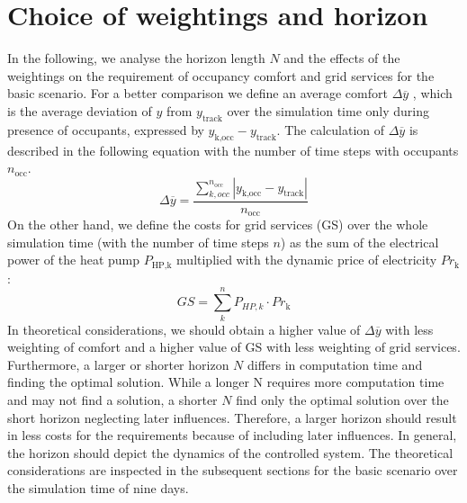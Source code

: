 \section{Choice of weightings and horizon}
\label{Choise of weigtings and horizon}
In the following, we analyse the horizon length $N$  and the effects of the weightings on the requirement of occupancy comfort and grid services for the basic scenario. For a better comparison we define an average comfort $\Delta \overline{y}$ , which is the average deviation of $y$ from $y_\text{track}$ over the simulation time only during presence of occupants, expressed by $y_\text{k,occ} - y_\text{track}$. The calculation of $\Delta \overline{y}$ is described in the following equation with the number of time steps with occupants $n_\text{occ}$.
\begin{equation}
    \label{eq:average comfort}
    \Delta \overline{y} = \frac{\sum_{k,occ}^{n_\text{occ}} |y_\text{k,occ} - y_\text{track}|}{n_\text{occ}}
\end{equation}
On the other hand, we define the costs for grid services (GS)  over the whole simulation time (with the number of time steps $n$) as the sum of the electrical power of the heat pump $P_\text{HP,k}$ multiplied with the dynamic price of electricity $Pr_\text{k}$:
\begin{equation}
\label{eq:GridService123}
    GS = \sum_{k}^n P_{HP,k}\cdot Pr_\text{k}
\end{equation}
In theoretical considerations, we should obtain a higher value of $\Delta \overline{y}$ with less weighting of comfort and a higher value of GS with less weighting of grid services. Furthermore, a larger or shorter horizon $N$ differs in computation time and finding the optimal solution. While a longer N requires more computation time and may not find a solution, a shorter $N$ find only the optimal solution over the short horizon neglecting later influences. Therefore, a larger horizon should result in less costs for the requirements because of including later influences. In general, the horizon should depict the dynamics of the controlled system. \newline
The theoretical considerations are inspected in the subsequent sections for the basic scenario over the simulation time of nine days.   


